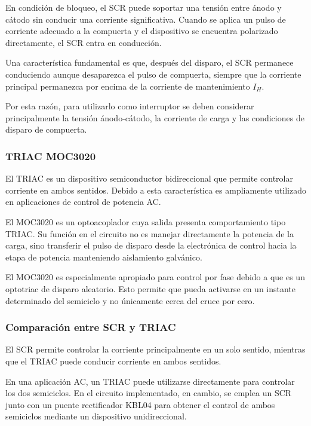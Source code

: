 \documentclass[12pt]{article}
\begin{document}
En condición de bloqueo, el SCR puede soportar una tensión entre ánodo y
cátodo sin conducir una corriente significativa. Cuando se aplica un pulso
de corriente adecuado a la compuerta y el dispositivo se encuentra
polarizado directamente, el SCR entra en conducción.

Una característica fundamental es que, después del disparo, el SCR permanece
conduciendo aunque desaparezca el pulso de compuerta, siempre que la corriente
principal permanezca por encima de la corriente de mantenimiento $I_H$.

Por esta razón, para utilizarlo como interruptor se deben considerar
principalmente la tensión ánodo-cátodo, la corriente de carga y las
condiciones de disparo de compuerta.

\subsubsection{TRIAC MOC3020}

El TRIAC es un dispositivo semiconductor bidireccional que permite controlar
corriente en ambos sentidos. Debido a esta característica es ampliamente
utilizado en aplicaciones de control de potencia AC.

El MOC3020 es un optoacoplador cuya salida presenta comportamiento tipo
TRIAC. Su función en el circuito no es manejar directamente la potencia de
la carga, sino transferir el pulso de disparo desde la electrónica de control
hacia la etapa de potencia manteniendo aislamiento galvánico.

El MOC3020 es especialmente apropiado para control por fase debido a que es
un optotriac de disparo aleatorio. Esto permite que pueda activarse en un
instante determinado del semiciclo y no únicamente cerca del cruce por cero.

\subsubsection{Comparación entre SCR y TRIAC}

El SCR permite controlar la corriente principalmente en un solo sentido,
mientras que el TRIAC puede conducir corriente en ambos sentidos.

En una aplicación AC, un TRIAC puede utilizarse directamente para controlar
los dos semiciclos. En el circuito implementado, en cambio, se emplea un SCR
junto con un puente rectificador KBL04 para obtener el control de ambos
semiciclos mediante un dispositivo unidireccional.
\end{document}
